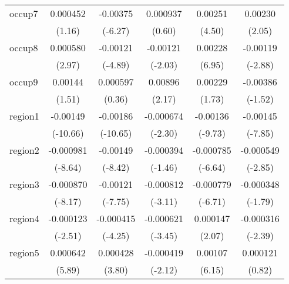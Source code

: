 \begin{table}[htbp]
\begin{tabular}{l*{5}{c}}
occup7      &    0.000452         &    -0.00375\sym{***}&    0.000937         &     0.00251\sym{***}&     0.00230\sym{*}  \\
            &      (1.16)         &     (-6.27)         &      (0.60)         &      (4.50)         &      (2.05)         \\
occup8      &    0.000580\sym{**} &    -0.00121\sym{***}&    -0.00121\sym{*}  &     0.00228\sym{***}&    -0.00119\sym{**} \\
            &      (2.97)         &     (-4.89)         &     (-2.03)         &      (6.95)         &     (-2.88)         \\
occup9      &     0.00144         &    0.000597         &     0.00896\sym{*}  &     0.00229         &    -0.00386         \\
            &      (1.51)         &      (0.36)         &      (2.17)         &      (1.73)         &     (-1.52)         \\
region1     &    -0.00149\sym{***}&    -0.00186\sym{***}&   -0.000674\sym{*}  &    -0.00136\sym{***}&    -0.00145\sym{***}\\
            &    (-10.66)         &    (-10.65)         &     (-2.30)         &     (-9.73)         &     (-7.85)         \\
region2     &   -0.000981\sym{***}&    -0.00149\sym{***}&   -0.000394         &   -0.000785\sym{***}&   -0.000549\sym{**} \\
            &     (-8.64)         &     (-8.42)         &     (-1.46)         &     (-6.64)         &     (-2.85)         \\
region3     &   -0.000870\sym{***}&    -0.00121\sym{***}&   -0.000812\sym{**} &   -0.000779\sym{***}&   -0.000348         \\
            &     (-8.17)         &     (-7.75)         &     (-3.11)         &     (-6.71)         &     (-1.79)         \\
region4     &   -0.000123\sym{*}  &   -0.000415\sym{***}&   -0.000621\sym{***}&    0.000147\sym{*}  &   -0.000316\sym{*}  \\
            &     (-2.51)         &     (-4.25)         &     (-3.45)         &      (2.07)         &     (-2.39)         \\
region5     &    0.000642\sym{***}&    0.000428\sym{***}&   -0.000419\sym{*}  &     0.00107\sym{***}&    0.000121         \\
            &      (5.89)         &      (3.80)         &     (-2.12)         &      (6.15)         &      (0.82)         \\

\end{tabular}
\end{table}
